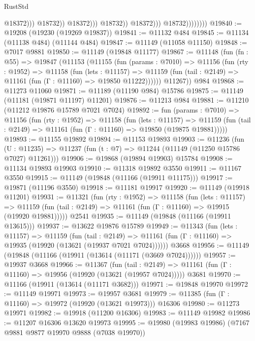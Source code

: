 \begin{lexlean}{RustStd}
\begin{coremodule}
                                              @18372)))
                                        @18732))
                                    @18372)))
                              @18732))
                          @18372)))
                    @18732))))))))
@19840 := @19208 (@19230 (@19269 @19837))
@19841 := @11132 @484
@19845 := @11134 (@11138 @484) (@11144 @484)
@19847 := @11149 (@11058 @11150)
@19848 := @7017 @9881
@19850 := @11149 (@19848 @11177)
@19867 := @11148
    (fun (fn : @55) =>
    @19847
      (@11153
        (@11155
          (fun (params : @7010) =>
          @11156
            (fun (rty : @1952) =>
            @11158
              (fun (lets : @11157) =>
              @11159 (fun (tail : @2149) => @11161 (fun (Γ : @11160) => @19850 @11222))))))
        @11267))
    @984
@19868 := @11273 @11060
@19871 := @11189 (@11190 @984) @15786
@19875 := @11149 (@11181 (@19871 @11197) @11201)
@19876 := @11213 @984
@19881 := @11210 (@11212 @19876 @15789 @7021 @7024)
@19892 := fun (params : @7010) =>
  @11156
    (fun (rty : @1952) =>
    @11158
      (fun (lets : @11157) =>
      @11159 (fun (tail : @2149) => @11161 (fun (Γ : @11160) => @19850 (@19875 @19881)))))
@19893 := @11155 @19892
@19894 := @11153 @19893
@19903 := @11236
    (fun (U : @11235) => @11237 (fun (t : @7) => @11244 (@11149 (@11250 @15786 @7027) @11261)))
@19906 := @19868 (@19894 @19903) @15784
@19908 := @11134 @19893 @19903
@19910 := @11318 @19892 @3550
@19911 := @11167 @3550
@19915 := @11149 (@19848 (@11166 (@19911 @11175)))
@19917 := @19871 (@11196 @3550)
@19918 := @11181 @19917
@19920 := @11149 (@19918 @11201)
@19931 := @11321
    (fun (rty : @1952) =>
    @11158
      (fun (lets : @11157) =>
      @11159 (fun (tail : @2149) => @11161 (fun (Γ : @11160) => @19915 (@19920 @19881)))))
    @2541
@19935 := @11149 (@19848 (@11166 (@19911 @13615)))
@19937 := @13622 @19876 @15789
@19949 := @11343
    (fun (lets : @11157) =>
    @11159
      (fun (tail : @2149) =>
      @11161 (fun (Γ : @11160) => @19935 (@19920 (@13621 (@19937 @7021 @7024))))))
    @3668
@19956 := @11149 (@19848 (@11166 (@19911 (@13614 (@11171 (@3669 @7024))))))
@19957 := @19937 @3668
@19966 := @11367
    (fun (tail : @2149) => @11161 (fun (Γ : @11160) => @19956 (@19920 (@13621 (@19957 @7024)))))
    @3681
@19970 := @11166 (@19911 (@13614 (@11171 @3682)))
@19971 := @19848 @19970
@19972 := @11149 @19971
@19973 := @19957 @3681
@19979 := @11385 (fun (Γ : @11160) => @19972 (@19920 (@13621 @19973))) @16306
@19980 := @11273 @19971
@19982 := @19918 (@11200 @16306)
@19983 := @11149 @19982
@19986 := @11207 @16306 @13620 @19973
@19995 := @19980 (@19983 @19986) (@7167 @9881 @9877 @19970 @9888 (@7038 @19970))

\end{coremodule}
\end{lexlean}
